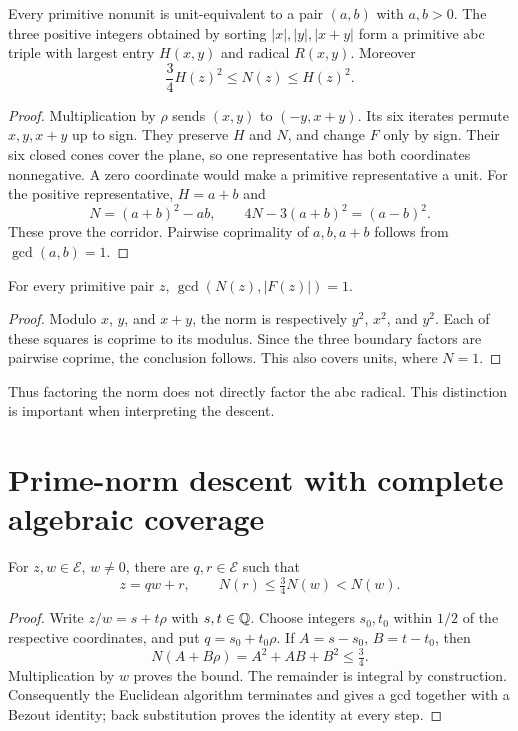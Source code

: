 \begin{lemma}\label{eisenstein:lem:height}
Every primitive nonunit is unit-equivalent to a pair $(a,b)$ with $a,b>0$. The three positive integers obtained by sorting $|x|,|y|,|x+y|$ form a primitive abc triple with largest entry $H(x,y)$ and radical $R(x,y)$. Moreover
\begin{equation}\label{eisenstein:eq:corridor}
\frac34H(z)^2\le N(z)\le H(z)^2.
\end{equation}
\end{lemma}
\begin{proof}
Multiplication by $\rho$ sends $(x,y)$ to $(-y,x+y)$. Its six iterates permute $x,y,x+y$ up to sign. They preserve $H$ and $N$, and change $F$ only by sign. Their six closed cones cover the plane, so one representative has both coordinates nonnegative. A zero coordinate would make a primitive representative a unit. For the positive representative, $H=a+b$ and
\[
N=(a+b)^2-ab,\qquad 4N-3(a+b)^2=(a-b)^2.
\]
These prove the corridor. Pairwise coprimality of $a,b,a+b$ follows from $\gcd(a,b)=1$.
\end{proof}

\begin{lemma}\label{eisenstein:lem:disjoint}
For every primitive pair $z$, $\gcd(N(z),|F(z)|)=1$.
\end{lemma}
\begin{proof}
Modulo $x$, $y$, and $x+y$, the norm is respectively $y^2$, $x^2$, and $y^2$. Each of these squares is coprime to its modulus. Since the three boundary factors are pairwise coprime, the conclusion follows. This also covers units, where $N=1$.
\end{proof}
Thus factoring the norm does not directly factor the abc radical. This distinction is important when interpreting the descent.

\section{Prime-norm descent with complete algebraic coverage}
\begin{lemma}\label{eisenstein:lem:euclidean}
For $z,w\in\mathcal E$, $w\ne0$, there are $q,r\in\mathcal E$ such that
\[
z=qw+r,\qquad N(r)\le\tfrac34N(w)<N(w).
\]
\end{lemma}
\begin{proof}
Write $z/w=s+t\rho$ with $s,t\in\mathbb Q$. Choose integers $s_0,t_0$ within $1/2$ of the respective coordinates, and put $q=s_0+t_0\rho$. If $A=s-s_0$, $B=t-t_0$, then
\[
N(A+B\rho)=A^2+AB+B^2\le\tfrac34.
\]
Multiplication by $w$ proves the bound. The remainder is integral by construction. Consequently the Euclidean algorithm terminates and gives a gcd together with a Bezout identity; back substitution proves the identity at every step.
\end{proof}

